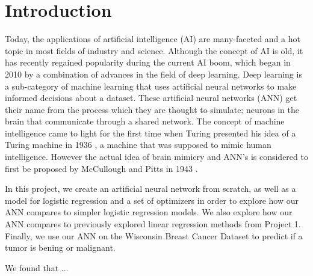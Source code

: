 \section{Introduction}\label{sec:introduction}


Today, the applications of artificial intelligence (AI) are many-faceted and a hot topic in most fields
of industry and science. Although the concept of AI is old, it has recently regained popularity during the current AI boom, 
which began in 2010 by a combination of advances in the field of deep learning. Deep learning is a sub-category of machine learning that uses 
artificial neural networks to make informed decisions about a dataset. These artificial neural networks (ANN) get their name from 
the process which they are thought to simulate; neurons in the brain that communicate through a shared network. 
The concept of machine intelligence came to light for the first time when Turing presented his idea of 
a Turing machine in 1936 \cite{turing_36}, a machine that was supposed to mimic human intelligence. 
However the actual idea of brain mimicry and ANN's is considered to first be proposed by McCullough and Pitts in 1943 \cite{mccu_pitt}.

In this project, we create an artificial neural network from scratch, as well as a model for logistic regression and a set of optimizers 
in order to explore how our ANN compares to simpler logistic regression models. We also explore how our ANN compares to previously 
explored linear regression methods from Project 1. Finally, we use our ANN on the Wisconsin Breast Cancer Dataset to predict if a
tumor is bening or malignant. 

We found that ...

